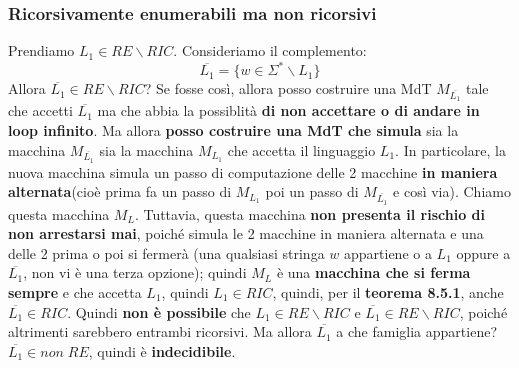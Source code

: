 \documentclass[12pt]{article}
\begin{document}
\subsubsection{Ricorsivamente enumerabili ma non ricorsivi}
Prendiamo $L_1 \in RE \backslash RIC$. Consideriamo il complemento:
$$\overline{L_1} = \{w \in \Sigma^* \backslash L_1\}$$
Allora $\overline{L_1} \in RE \backslash RIC$? Se fosse così, allora posso costruire una MdT $M_{\overline{L_1}}$ tale che accetti $\overline{L_1}$ ma che abbia la possiblità \textbf{di non accettare o di andare in loop infinito}. Ma allora \textbf{posso costruire una MdT che simula} sia la macchina $M_{\overline{L_1}}$ sia la macchina $M_{L_1}$ che accetta il linguaggio $L_1$. In particolare, la nuova macchina simula un passo di computazione delle 2 macchine \textbf{in maniera alternata}(cioè prima fa un passo di $M_{L_1}$ poi un passo di $M_{\overline{L_1}}$ e così via). Chiamo questa macchina $M_L$. Tuttavia, questa macchina \textbf{non presenta il rischio di non arrestarsi mai}, poiché simula le 2 macchine in maniera alternata e una delle 2 prima o poi si fermerà (una qualsiasi stringa $w$ appartiene o a $L_1$ oppure a $\overline{L_1}$, non vi è una terza opzione); quindi $M_L$ è una \textbf{macchina che si ferma sempre} e che accetta $L_1$, quindi $L_1 \in RIC$, quindi, per il \textbf{teorema 8.5.1}, anche $\overline{L_1} \in RIC$. \newline Quindi \textbf{non è possibile} che $L_1 \in RE \backslash RIC$ e $\overline{L_1} \in RE \backslash RIC$, poiché altrimenti sarebbero entrambi ricorsivi. Ma allora $\overline{L_1}$ a che famiglia appartiene? $\overline{L_1} \in non \; RE$, quindi è \textbf{indecidibile}.
\end{document}

